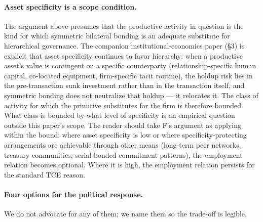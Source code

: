 \documentclass[11pt,a4paper]{article}
\theoremstyle{remark}
\begin{document}
\paragraph{Asset specificity is a scope condition.}
The argument above presumes that the productive activity in
question is the kind for which symmetric bilateral bonding is an
adequate substitute for hierarchical governance. The
companion institutional-economics paper (§3) is
explicit that asset specificity continues to favor hierarchy:
when a productive asset's value is contingent on a specific
counterparty (relationship-specific human capital, co-located
equipment, firm-specific tacit routine), the holdup risk lies in
the pre-transaction sunk investment rather than in the
transaction itself, and symmetric bonding does not neutralize
that holdup --- it relocates it. The class of activity for which
the primitive substitutes for the firm is therefore bounded.
What class is bounded by what level of specificity is an
empirical question outside this paper's scope. The reader should
take F's argument as applying within the bound: where asset
specificity is low or where specificity-protecting arrangements
are achievable through other means (long-term peer networks,
treasury communities, serial bonded-commitment patterns), the
employment relation becomes optional. Where it is high, the
employment relation persists for the standard TCE reason.

\paragraph{Four options for the political response.}
We do not advocate for any of them; we name them so the trade-off
is legible.
\end{document}

